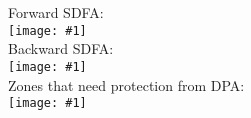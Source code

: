 \documentclass{article}
\begin{document}
\newcommand{\grafico}[1]{\\\texttt{[image: \#1]}\\}
\begin{center}

Forward SDFA:\grafico{forward}
Backward SDFA:\grafico{backward}
Zones that need protection from DPA:\grafico{prot_dpa}




\end{center}
\end{document}
